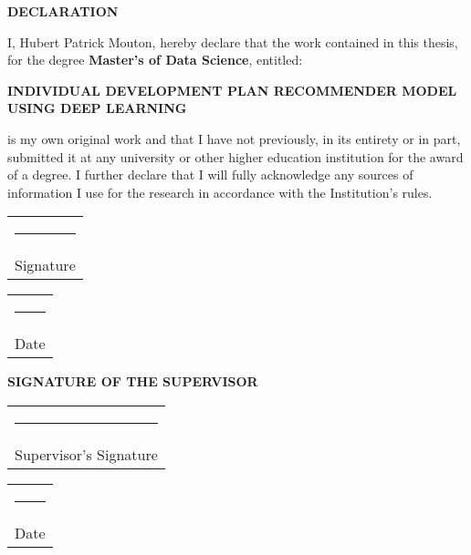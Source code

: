 \thispagestyle{empty}

\vspace*{1cm}

\begin{center}
\Large \textbf{DECLARATION}
\end{center}

\vspace{1cm}

\noindent
I, Hubert Patrick Mouton, hereby declare that the work contained in this thesis, for the degree \textbf{Master's of Data Science}, entitled:

\vspace{0.5cm}

\begin{center}
\textbf{INDIVIDUAL DEVELOPMENT PLAN RECOMMENDER MODEL USING DEEP LEARNING}
\end{center}

\vspace{0.5cm}

is my own original work and that I have not previously, in its entirety or in part, submitted it at any university or other higher education institution for the award of a degree. I further declare that I will fully acknowledge any sources of information I use for the research in accordance with the Institution's rules.

\vspace{2cm}

\noindent
\hfill
\begin{tabular}[t]{c}
  \rule{10em}{0.4pt}\\
  Signature
\end{tabular}
\hfill
\begin{tabular}[t]{c}
  \rule{10em}{0.4pt}\\
  Date
\end{tabular}
\hfill\strut

\vspace{2cm}

\begin{center}
\Large \textbf{SIGNATURE OF THE SUPERVISOR}
\end{center}

\vspace{1cm}

\noindent
\hfill
\begin{tabular}[t]{c}
  \rule{10em}{0.4pt}\\
  Supervisor's Signature
\end{tabular}
\hfill
\begin{tabular}[t]{c}
  \rule{10em}{0.4pt}\\
  Date
\end{tabular}
\hfill\strut

\clearpage

